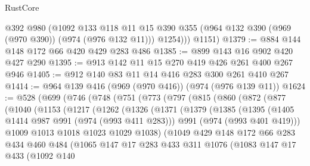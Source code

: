 \begin{lexlean}{RustCore}
\begin{coremodule}
          @392
          @980
          (@1092
            @133
            @118
            @11
            @15
            @390
            @355
            (@964 @132 @390 (@969 (@970 @390)) (@974 (@976 @132 @11)))
            @1254)))
      @1151)
@1379 := @884 @144 @148 @172 @66 @420 @429 @283 @486
@1385 := @899 @143 @16 @902 @420 @427 @290
@1395 := @913 @142 @11 @15 @270 @419 @426 @261 @400 @267 @946
@1405 := @912 @140 @83 @11 @14 @416 @283 @300 @261 @410 @267
@1414 := @964 @139 @416 (@969 (@970 @416)) (@974 (@976 @139 @11))
@1624 := @528
    (@699
      (@746
        (@748
          (@751
            (@773
              (@797
                (@815
                  (@860
                    (@872
                      (@877
                        (@1040
                          (@1153
                            (@1217
                              (@1262
                                (@1326
                                  (@1371
                                    (@1379
                                      (@1385
                                        (@1395
                                          (@1405 @1414 @987 @991 (@974 (@993 @411 @283)))
                                          @991
                                          (@974 (@993 @401 @419)))
                                        @1009
                                        @1013
                                        @1018
                                        @1023
                                        @1029
                                        @1038)
                                      (@1049
                                        @429
                                        @148
                                        @172
                                        @66
                                        @283
                                        @434
                                        @460
                                        @484
                                        (@1065
                                          @147
                                          @17
                                          @283
                                          @433
                                          @311
                                          @1076
                                          (@1083
                                            @147
                                            @17
                                            @433
                                            (@1092
                                              @140

\end{coremodule}
\end{lexlean}
